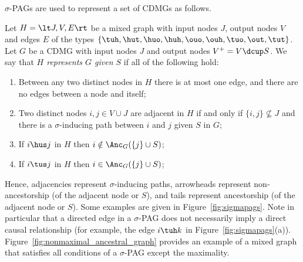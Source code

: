 $\sigma$-PAGs are used to represent a set of CDMGs as follows.
\begin{Def}\label{def:sigmapag_represents_cdmg}
  Let $H = \lt J,V,E\rt$ be a mixed graph with input nodes $J$, output nodes $V$ and edges $E$ of the types $\{\tuh,\hut,\huo,\huh,\ouo,\ouh,\tuo,\out,\tut\}$.
  Let $G$ be a CDMG with input nodes $J$ and output nodes $V^+ = V \dcup S$.
  We say that \emph{$H$ represents $G$ given $S$} if all of the following hold:
  \begin{enumerate}
    \item Between any two distinct nodes in $H$ there is at most one edge, and there are no edges between a node and itself;
    \item Two distinct nodes $i,j \in V \cup J$ are adjacent in $H$ if and only if $\{i,j\} \not\subseteq J$ and there is a $\sigma$-inducing path between $i$ and $j$ given $S$ in $G$;
    \item If $i \hus j$ in $H$ then $i \notin \Anc_{G}(\{j\} \cup S)$;
    \item If $i \tus j$ in $H$ then $i \in \Anc_{G}(\{j\} \cup S)$;
  \end{enumerate}
\end{Def}
Hence, adjacencies represent $\sigma$-inducing paths, arrowheads represent non-ancestorship (of the adjacent node or $S$), and tails represent ancestorship (of the adjacent node or $S$).
Some examples are given in Figure~\ref{fig:sigmapags}. 
Note in particular that a directed edge in a $\sigma$-PAG does not necessarily imply a direct causal relationship (for example, the edge $i \tuh k$ in Figure~\ref{fig:sigmapags}(a)).
Figure~\ref{fig:nonmaximal_ancestral_graph} provides an example of a mixed graph that satisfies all conditions of a $\sigma$-PAG except the maximality.

